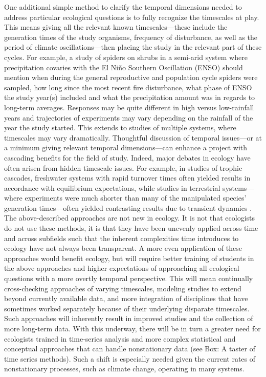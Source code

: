 \documentclass[11pt,a4paper,oneside]{article}
\begin{document}
One additional simple method to clarify the temporal dimensions needed to address particular ecological questions is to fully recognize the timescales at play. This means giving all the relevant known timescales---these include the generation times of the study organisms, frequency of disturbance, as well as the period of climate oscillations---then placing the study in the relevant part of these cycles. For example, a study of spiders on shrubs in a semi-arid system where precipitation covaries with the El Ni\~no Southern Oscillation (ENSO) should mention when during the general reproductive and population cycle spiders were sampled, how long since the most recent fire disturbance, what phase of ENSO the study year(s) included and what the precipitation amount was in regards to long-term averages. Responses may be quite different in high versus low-rainfall years and trajectories of experiments may vary depending on the rainfall of the year the study started. This extends to studies of multiple systems, where timescales may vary dramatically. Thoughtful discussion of temporal issues---or at a minimum giving relevant temporal dimensions---can enhance a project with cascading benefits for the field of study. Indeed, major debates in ecology have often arisen from hidden timescale issues. For example, in studies of trophic cascades, freshwater systems with rapid turnover times often yielded results in accordance with equilibrium expectations, while studies in terrestrial systems---where experiments were much shorter than many of the manipulated species' generation times---often yielded contrasting results due to transient dynamics \citep{Cebrian:2009hg}.\\ 

The above-described approaches are not new in ecology. It is not that ecologists do not use these methods, it is that they have been unevenly applied across time and across subfields such that the inherent complexities time introduces to ecology have not always been transparent. A more even application of these approaches would benefit ecology, but will require better training of students in the above approaches and higher expectations of approaching all ecological questions with a more overtly temporal perspective. This will mean continually cross-checking approaches of varying timescales, modeling studies to extend beyond currently available data, and more integration of disciplines that have sometimes worked separately because of their underlying disparate timescales. Such approaches will inherently result in improved studies and the collection of more long-term data.  With this underway, there will be in turn a greater need for ecologists trained in time-series analysis and more complex statistical and conceptual approaches that can handle nonstationary data (see Box: A taster of time series methods). Such a shift is especially needed given the current rates of nonstationary processes, such as climate change, operating in many systems. \\
\end{document}
